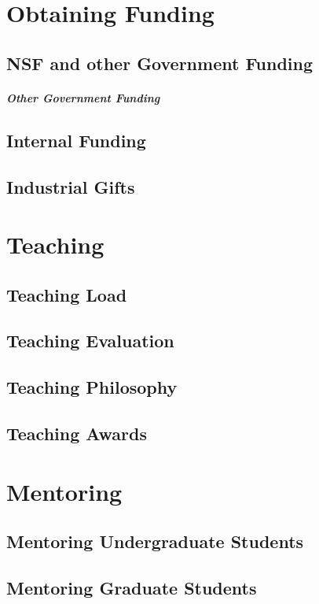 \documentclass[oneside,11pt]{memoir}
\begin{document}
\chapter{Obtaining Funding}
\section{NSF and other Government Funding}

\paragraph{Other Government Funding}

\section{Internal Funding}

\section{Industrial Gifts}

\chapter{Teaching}
\section{Teaching Load}
\section{Teaching Evaluation}
\section{Teaching Philosophy}
\section{Teaching Awards}



\chapter{Mentoring}
\section{Mentoring Undergraduate Students}
\section{Mentoring Graduate Students}
\end{document}
